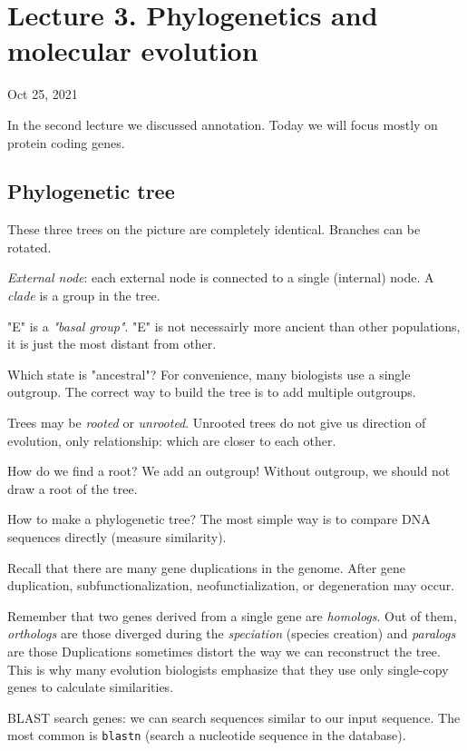 \documentclass[main.tex]{subfiles}
\begin{document}
\section{Lecture 3.  Phylogenetics and molecular evolution}
Oct 25, 2021

In the second lecture we discussed annotation.
Today we will focus mostly on protein coding genes.

\subsection{Phylogenetic tree}

These three trees on the picture are completely identical.
Branches can be rotated.

\emph{External node}: each external node is connected to a single (internal) node.
A \emph{clade} is a group in the tree.

"E" is a \emph{"basal group"}.
"E" is not necessairly more ancient than other populations, it is just the most distant from other.

Which state is "ancestral"?
For convenience, many biologists use a single outgroup.
The correct way to build the tree is to add multiple outgroups.

Trees may be \emph{rooted} or \emph{unrooted}.
Unrooted trees do not give us direction of evolution, only relationship: which are closer to each other.

How do we find a root?
We add an outgroup!
Without outgroup, we should not draw a root of the tree.

How to make a phylogenetic tree?
The most simple way is to compare DNA sequences directly (measure similarity).

Recall that there are many gene duplications in the genome.
After gene duplication, subfunctionalization, neofunctialization, or degeneration may occur.

Remember that two genes derived from a single gene are \emph{homologs}.
Out of them, \emph{orthologs} are those diverged during the \emph{speciation} (species creation) and \emph{paralogs} are those 
Duplications sometimes distort the way we can reconstruct the tree.
This is why many evolution biologists emphasize that they use only single-copy genes to calculate similarities.

BLAST search genes:
we can search sequences similar to our input sequence.
The most common is \texttt{blastn} (search a nucleotide sequence in the database).
\end{document}
